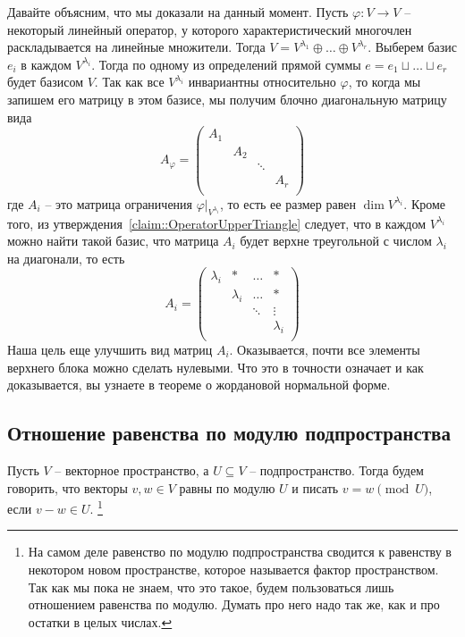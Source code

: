 Давайте объясним, что мы доказали на данный момент.
Пусть $\varphi\colon V\to V$ -- некоторый линейный оператор, у которого характеристический многочлен раскладывается на линейные множители.
Тогда $V = V^{\lambda_1}\oplus\ldots\oplus V^{\lambda_r}$.
Выберем базис $e_i$ в каждом $V^{\lambda_i}$.
Тогда по одному из определений прямой суммы $e = e_1 \sqcup \ldots \sqcup e_r$ будет базисом $V$.
Так как все $V^{\lambda_i}$ инвариантны относительно $\varphi$, то когда мы запишем его матрицу в этом базисе, мы получим блочно диагональную матрицу вида
\[
A_\varphi = 
\begin{pmatrix}
{A_1}&{}&{}&{}\\
{}&{A_2}&{}&{}\\
{}&{}&{\ddots}&{}\\
{}&{}&{}&{A_r}\\
\end{pmatrix}
\]
где $A_i$ -- это матрица ограничения $\varphi|_{V^{\lambda_i}}$, то есть ее размер равен $\dim V^{\lambda_i}$.
Кроме того, из утверждения~\ref{claim::OperatorUpperTriangle} следует, что в каждом $V^{\lambda_i}$ можно найти такой базис, что матрица $A_i$ будет верхне треугольной с числом $\lambda_i$ на диагонали, то есть
\[
A_i = 
\begin{pmatrix}
{\lambda_i}&{*}&{\ldots}&{*}\\
{}&{\lambda_i}&{\ldots}&{*}\\
{}&{}&{\ddots}&{\vdots}\\
{}&{}&{}&{\lambda_i}\\
\end{pmatrix}
\]
Наша цель еще улучшить вид матриц $A_i$.
Оказывается, почти все элементы верхнего блока можно сделать нулевыми.
Что это в точности означает и как доказывается, вы узнаете в теореме о жордановой нормальной форме.


\subsection{Отношение равенства по модулю подпространства}

\begin{definition}
Пусть $V$ -- векторное пространство, а $U\subseteq V$ -- подпространство.
Тогда будем говорить, что векторы $v,w\in V$ равны по модулю $U$ и писать $v = w \pmod U$, если $v - w \in U$.%
\footnote{На самом деле равенство по модулю подпространства сводится к равенству в некотором новом пространстве, которое называется фактор пространством.
Так как мы пока не знаем, что это такое, будем пользоваться лишь отношением равенства по модулю.
Думать про него надо так же, как и про остатки в целых числах.}
\end{definition}

